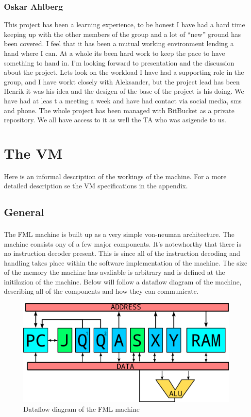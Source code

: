 \documentclass{article}
\begin{document}
\subsubsection{Oskar Ahlberg}
This project has been a learning experience, to be honest I have had a hard time keeping up with the other 
members of the group and a lot of ``new'' ground has been covered. I feel that
it has been a mutual working environment lending a hand where I can. At a whole its been hard work to keep the pace to have something to hand in. 
I'm looking forward to presentation and the discussion about the project. Lets look on the workload 
I have had a supporting role in the group, and I have workt closely with Aleksander, but the project lead
 has been Henrik it was his idea and the desigen of the base of the project is 
 his doing. We have had at leas t a meeting a week and have had contact via
 social media, sms and phone. The whole project has been managed with BitBucket
 as a private repository. We all have access to it as well the TA who was
 asigende to us.

\section{The VM}
Here is an informal description of the workings of the machine. For a more
detailed description se the VM specifications in the appendix.
\subsection{General}

The FML machine is built up as a very simple von-neuman
architecture\textsuperscript{\cite{neuman}}. The machine consists ony of a few
major components. It's notewhorthy that there is no instruction decoder present. 
This is since all of the instruction decoding
and handling takes place within the software implementation of the machine.
The size of the memory the machine has avaliable is arbitrary and is defined at
the initilazion of the machine. Below will follow a dataflow diagram of the
machine, describing all of the components and how they can communicate.  

\begin{figure}[H]
\includegraphics[width=\textwidth,height=\textheight,keepaspectratio]{Dataflow.png}
\caption{Dataflow diagram of the FML machine}
\end{figure}       
\end{document}
